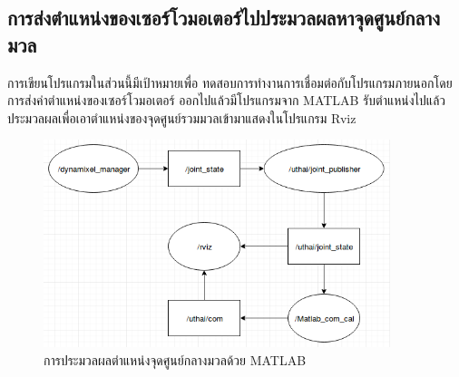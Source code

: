 \subsection{การส่งตำแหน่งของเซอร์โวมอเตอร์ไปประมวลผลหาจุดศูนย์กลางมวล}
การเขียนโปรแกรมในส่วนนี้มีเป้าหมายเพื่อ ทดสอบการทำงานการเชื่อมต่อกับโปรแกรมภายนอกโดยการส่งค่าตำแหน่งของเซอร์โวมอเตอร์
ออกไปแล้วมีโปรแกรมจาก MATLAB รับตำแหน่งไปแล้วประมวลผลเพื่อเอาตำแหน่งของจุดศูนย์รวมมวลเข้ามาแสดงในโปรแกรม Rviz
\begin{figure}[!ht]
	\centering
	\includegraphics[width=0.9\textwidth]{chapter3/images/matlab_com.png}
	\caption{การประมวลผลตำแหน่งจุดศูนย์กลางมวลด้วย MATLAB}
\end{figure}

